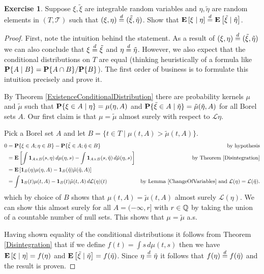 \documentclass{amsart}
\theoremstyle{remark}
\theoremstyle{definition}
\newtheorem{ex}[thm]{Exercise}
\begin{document}
\begin{ex}Suppose $\xi, \tilde{\xi}$ are integrable random variables
  and $\eta, \tilde{\eta}$ are random elements in $(T, \mathcal{T})$
  such that $(\xi,\eta) \eqdist (\tilde{\xi}, \tilde{\eta})$.  Show
  that $\cexpectationlong{\eta}{\xi} \eqdist \cexpectationlong{\tilde{\eta}}{\tilde{\xi}}$.
\end{ex}
\begin{proof}
First, note the intuition behind the statement.  As a result of
$(\xi,\eta) \eqdist (\tilde{\xi}, \tilde{\eta})$ we can also conclude
that $\xi \eqdist \tilde{\xi}$ and $\eta \eqdist \tilde{\eta}$.
However, we also expect that the conditional distributions on $T$ are
equal (thinking heuristically of a formula like $\cprobability{B}{A} =
\probability{A \cap B} / \probability{B}$).  The first order of
business is to formulate this intuition precisely and prove it.

By Theorem \ref{ExistenceConditionalDistribution} there are
probability kernels $\mu$ and $\tilde{\mu}$ such that
$\cprobability{\eta}{\xi \in A} = \mu(\eta, A)$ and
$\cprobability{\tilde{\eta}}{\tilde{\xi} \in A} =
\tilde{\mu}(\tilde{\eta}, A)$ for all Borel sets $A$.  Our first claim
is that $\mu = \tilde{\mu}$ almost surely with respect to
$\mathcal{L}{\eta}$.

Pick a Borel set $A$ and let $B = \lbrace t \in T \mid \mu(t, A) >
\tilde{\mu}(t, A) \rbrace$. 
\begin{align*}
0 &= \probability{\xi \in A; \eta \in B} - \probability{\tilde{\xi}
  \in A; \tilde{\eta} \in B} & \text{by hypothesis}\\
&=\expectation{\int \characteristic{A \times B}(s, \eta) \,
  d\mu(\eta, s) - \int \characteristic{A \times B}(s, \tilde{\eta}) \,
  d\tilde{\mu}(\eta, s)} & \text{by Theorem \ref{Disintegration}}\\
&=\expectation{\characteristic{B}(\eta) \mu(\eta, A) -
  \characteristic{B}(\tilde{\eta}) \tilde{\mu}(\tilde{\eta}, A)} \\
&=\int \characteristic{B}(t) \mu(t, A) -
  \characteristic{B}(t) \tilde{\mu}(t, A) \, d\mathcal{L}(\eta)(t) &
  \text{by Lemma \ref{ChangeOfVariables} and $\mathcal{L}(\eta) = \mathcal{L}(\tilde{\eta})$.}
\end{align*}
which by choice of $B$ shows that $\mu(t, A) =\tilde{\mu}(t, A)$
almost surely $\mathcal{L}(\eta)$.  We can show this almost surely for all $A =
(-\infty, r]$ with $r \in \rationals$ by taking the union of a
countable number of null sets.  This shows that $\mu = \tilde{\mu}$
a.s.

Having shown equality of the conditional distributions it follows from
Theorem \ref{Disintegration} that if we define $f(t) = \int s \, d\mu(t,
s)$ then we have $\cexpectationlong{\eta}{\xi} = f(\eta)$ and
$\cexpectationlong{\tilde{\eta}}{\tilde{\xi}} = f(\tilde{\eta})$.
Since $\eta \eqdist \tilde{\eta}$ it follows that $f(\eta) \eqdist
f(\tilde{\eta})$ and the result is proven.
\end{proof}
\end{document}
